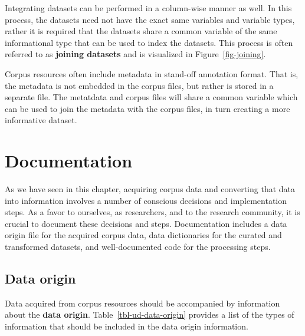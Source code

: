 \documentclass[
  letterpaper,
]{latex/krantz}
\theoremstyle{definition}
\theoremstyle{remark}
\begin{document}
Integrating datasets can be performed in a column-wise manner as well.
In this process, the datasets need not have the exact same variables and
variable types, rather it is required that the datasets share a common
variable of the same informational type that can be used to index the
datasets. This process is often referred to as \textbf{joining datasets}
and is visualized in Figure~\ref{fig-joining}.

Corpus resources often include metadata in stand-off annotation format.
That is, the metadata is not embedded in the corpus files, but rather is
stored in a separate file. The metatdata and corpus files will share a
common variable which can be used to join the metadata with the corpus
files, in turn creating a more informative dataset.

\section{Documentation}\label{sec-ud-documentation}

As we have seen in this chapter, acquiring corpus data and converting
that data into information involves a number of conscious decisions and
implementation steps. As a favor to ourselves, as researchers, and to
the research community, it is crucial to document these decisions and
steps. Documentation includes a data origin file for the acquired corpus
data, data dictionaries for the curated and transformed datasets, and
well-documented code for the processing steps.

\subsection{Data origin}\label{sec-ud-data-origin}

Data acquired from corpus resources should be accompanied by information
about the \textbf{data origin}. Table~\ref{tbl-ud-data-origin} provides
a list of the types of information that should be included in the data
origin information.
\end{document}
